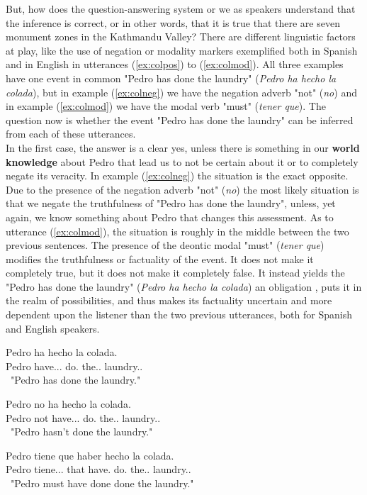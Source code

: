 But, how does the question-answering system or we as speakers understand that the inference is correct, or in other words, that it is true that there are seven monument zones in the Kathmandu Valley? There are different linguistic factors at play, like the use of negation or modality markers exemplified both in Spanish and in English in utterances (\ref{ex:colpos}) to (\ref{ex:colmod}). All three examples have one event in common "Pedro has done the laundry" (\textit{Pedro ha hecho la colada}), but in example (\ref{ex:colneg}) we have the negation adverb "not" (\textit{no}) and in example (\ref{ex:colmod}) we have the modal verb "must" (\textit{tener que}). The question now is whether the event "Pedro has done the laundry" can be inferred from each of these utterances.\\

In the first case, the answer is a clear yes, unless there is something in our \textbf{world knowledge} about Pedro that lead us to not be certain about it or to completely negate its veracity. In example (\ref{ex:colneg}) the situation is the exact opposite. Due to the presence of the negation adverb "not" (\textit{no}) the most likely situation is that we negate the truthfulness of "Pedro has done the laundry", unless, yet again, we know something about Pedro that changes this assessment. As to utterance (\ref{ex:colmod}), the situation is roughly in the middle between the two previous sentences. The presence of the deontic modal "must" (\textit{tener que}) modifies the truthfulness or factuality of the event. It does not make it completely true, but it does not make it completely false. It instead yields the "Pedro has done the laundry" (\textit{Pedro ha hecho la colada}) an obligation \citep{morante2012modality}, puts it in the realm of possibilities, and thus makes its factuality uncertain and more dependent upon the listener than the two previous utterances, both for Spanish and English speakers.\\

\begin{exe}
  \ex
    \begin{xlist}
      \item  {\gll Pedro ha hecho la colada.\\ Pedro have.\Prs.\Ind.\Tsg{} do.\Ptcp{} the.\F.\Sg{} laundry.\M.\Sg{}\\\ "Pedro has done the laundry."\glt }\label{ex:colpos}
      \item  {\gll Pedro no ha hecho la colada.\\ Pedro not have.\Prs.\Ind.\Tsg{} do.\Ptcp{} the.\F.\Sg{} laundry.\M.\Sg{}\\\ "Pedro hasn't done the laundry."\glt }\label{ex:colneg}
      \item  {\gll Pedro tiene que haber hecho la colada.\\ Pedro tiene.\Prs.\Ind.\Tsg{} that have.\Inf{} do.\Ptcp{} the.\F.\Sg{} laundry.\M.\Sg{}\\\ "Pedro must have done done the laundry."\glt }\label{ex:colmod}
    \end{xlist}
\end{exe}

